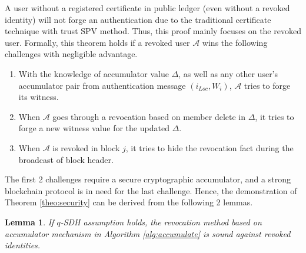 \documentclass[conference]{IEEEtran}
\newtheorem{lemma}{Lemma}[theorem]
\begin{document}
\begin{IEEEproof}
    A user without a registered certificate in public ledger (even without a revoked identity) will not forge an authentication due to the traditional certificate technique with trust SPV method. Thus, this proof mainly focuses on the revoked user. Formally, this theorem holds if a revoked user $\mathcal{A}$ wins the following challenges with negligible advantage.
    \begin{enumerate}
        \item With the knowledge of accumulator value $\Delta$, as well as any other user's accumulator pair from authentication message $(i_{Loc}, W_i)$, $\mathcal{A}$ tries to forge its witness.
        \item When $\mathcal{A}$ goes through a revocation based on member delete in $\Delta$, it tries to forge a new witness value for the updated $\Delta$.
        \item When $\mathcal{A}$ is revoked in block $j$, it tries to hide the revocation fact during the broadcast of block header.
    \end{enumerate}

    The first 2 challenges require a secure cryptographic accumulator, and a strong blockchain protocol is in need for the last challenge. Hence, the demonstration of Theorem \ref{theo:security} can be derived from the following 2 lemmas.
\end{IEEEproof}
\begin{lemma}
    If $q$-SDH assumption holds, the revocation method based on accumulator mechanism in Algorithm \ref{alg:accumulate} is sound against revoked identities.
\end{lemma}
\end{document}
